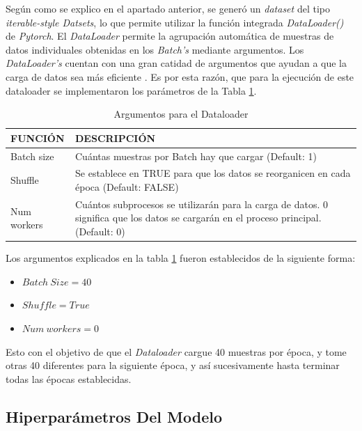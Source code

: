 Según como se explico en el apartado anterior, se generó un \textit{dataset} del tipo \textit{iterable-style Datsets}, lo que permite utilizar la función integrada \textit{DataLoader()} de \textit{Pytorch}. El \textit{DataLoader} permite la agrupación automática de muestras de datos individuales obtenidas en los \textit{Batch's} mediante argumentos. Los \textit{DataLoader's} cuentan con una gran catidad de argumentos que ayudan a que la carga de datos sea más eficiente \cite{Pytorch}. Es por esta razón, que para la ejecución de este dataloader se implementaron los parámetros de la Tabla \ref{table:Argumentos}.
\newpage			
\begin{table}[ht]
	\centering
	\begin{tabular}{|p{3cm}|p{8cm}|}
		\hline
		FUNCIÓN & DESCRIPCIÓN \\ 
		\hline
		Batch size & Cuántas muestras por Batch hay que cargar (Default: 1)\\
		\hline
		Shuffle & Se establece en TRUE para que los datos se reorganicen en cada época (Default: FALSE)  \\
		\hline
		Num workers & Cuántos subprocesos se utilizarán para la carga de datos. 0 significa que los datos se cargarán en el proceso principal. (Default: 0)\\
		\hline
	\end{tabular}	
	\caption{Argumentos para el Dataloader}
	\label{table:Argumentos}
\end{table}

Los argumentos explicados en la tabla \ref{table:Argumentos} fueron establecidos de la siguiente forma:

\begin{itemize}
	\item $Batch \ Size = 40$
	\item $Shuffle = True$
	\item $Num \ workers = 0$
\end{itemize}

Esto con el objetivo de que el \textit{Dataloader} cargue 40 muestras por época, y tome otras 40 diferentes para la siguiente época, y así sucesivamente hasta terminar todas las épocas establecidas.  





\subsection{Hiperparámetros Del Modelo}

